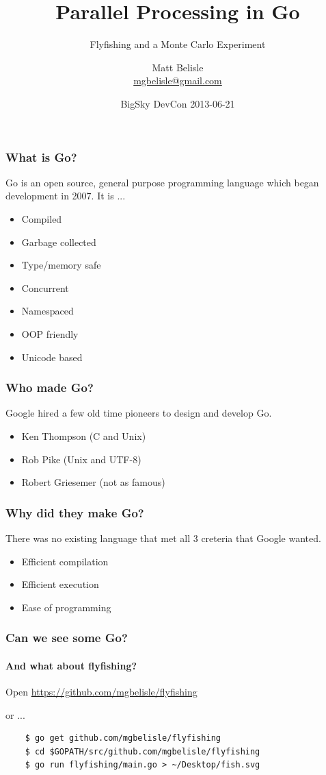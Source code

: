 \documentclass{beamer}
\title{Parallel Processing in Go}
\subtitle{Flyfishing and a Monte Carlo Experiment}
\author{Matt Belisle\\ \href{mailto:mgbelisle@gmail.com}{mgbelisle@gmail.com}}
\date{BigSky DevCon 2013-06-21}
\begin{document}
\begin{frame}
  \titlepage
\end{frame}
\begin{frame}
  \frametitle{What is Go?}

  Go is an open source, general purpose programming language which
  began development in 2007.  It is ...
  
  \begin{itemize}
    \item Compiled
    \item Garbage collected
    \item Type/memory safe
    \item Concurrent
    \item Namespaced
    \item OOP friendly
    \item Unicode based
  \end{itemize}
\end{frame}
\begin{frame}
  \frametitle{Who made Go?}

  Google hired a few old time pioneers to design and develop Go.
  
  \begin{itemize}
    \item Ken Thompson (C and Unix)
    \item Rob Pike (Unix and UTF-8)
    \item Robert Griesemer (not as famous)
  \end{itemize}
\end{frame}
\begin{frame}
  \frametitle{Why did they make Go?}

  There was no existing language that met all 3 creteria that Google
  wanted.
  
  \begin{itemize}
    \item Efficient compilation
    \item Efficient execution
    \item Ease of programming
  \end{itemize}
\end{frame}
\begin{frame}[fragile]
  \frametitle{Can we see some Go?}
  \framesubtitle{And what about flyfishing?}
  \begin{center}
    Open \url{https://github.com/mgbelisle/flyfishing}
    \bigskip

    or ...
  \end{center}  
  \begin{verbatim}
    $ go get github.com/mgbelisle/flyfishing
    $ cd $GOPATH/src/github.com/mgbelisle/flyfishing
    $ go run flyfishing/main.go > ~/Desktop/fish.svg
  \end{verbatim}
\end{frame}
\end{document}
